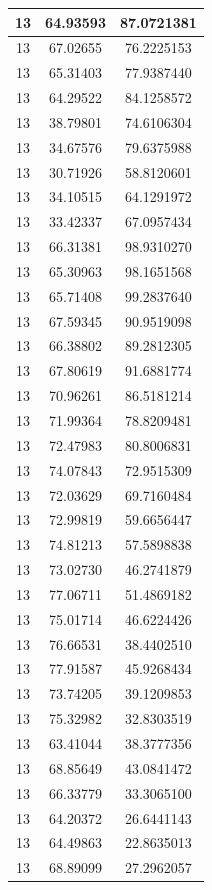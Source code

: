 \documentclass[
]{book}
\begin{document}
\begin{tabular}{c|c|c}
\hline
13 & 64.93593 & 87.0721381\\
\hline
13 & 67.02655 & 76.2225153\\
\hline
13 & 65.31403 & 77.9387440\\
\hline
13 & 64.29522 & 84.1258572\\
\hline
13 & 38.79801 & 74.6106304\\
\hline
13 & 34.67576 & 79.6375988\\
\hline
13 & 30.71926 & 58.8120601\\
\hline
13 & 34.10515 & 64.1291972\\
\hline
13 & 33.42337 & 67.0957434\\
\hline
13 & 66.31381 & 98.9310270\\
\hline
13 & 65.30963 & 98.1651568\\
\hline
13 & 65.71408 & 99.2837640\\
\hline
13 & 67.59345 & 90.9519098\\
\hline
13 & 66.38802 & 89.2812305\\
\hline
13 & 67.80619 & 91.6881774\\
\hline
13 & 70.96261 & 86.5181214\\
\hline
13 & 71.99364 & 78.8209481\\
\hline
13 & 72.47983 & 80.8006831\\
\hline
13 & 74.07843 & 72.9515309\\
\hline
13 & 72.03629 & 69.7160484\\
\hline
13 & 72.99819 & 59.6656447\\
\hline
13 & 74.81213 & 57.5898838\\
\hline
13 & 73.02730 & 46.2741879\\
\hline
13 & 77.06711 & 51.4869182\\
\hline
13 & 75.01714 & 46.6224426\\
\hline
13 & 76.66531 & 38.4402510\\
\hline
13 & 77.91587 & 45.9268434\\
\hline
13 & 73.74205 & 39.1209853\\
\hline
13 & 75.32982 & 32.8303519\\
\hline
13 & 63.41044 & 38.3777356\\
\hline
13 & 68.85649 & 43.0841472\\
\hline
13 & 66.33779 & 33.3065100\\
\hline
13 & 64.20372 & 26.6441143\\
\hline
13 & 64.49863 & 22.8635013\\
\hline
13 & 68.89099 & 27.2962057\\

\end{tabular}
\end{document}
